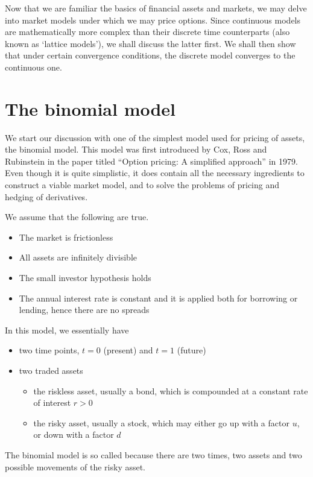 

Now that we are familiar the basics of financial assets and markets, we may delve into market models under which we may price options. Since continuous models are mathematically more complex than their discrete time counterparts (also known as `lattice models'), we shall discuss the latter first. We shall then show that under certain convergence conditions, the discrete model converges to the continuous one.



\section{The binomial model}
\label{sec:discrete-binom-model}

We start our discussion with one of the simplest model used for pricing of assets, the binomial model. This model was first introduced by Cox, Ross and Rubinstein \cite{Cox1979} in the paper titled ``Option pricing: A simplified approach'' in 1979. Even though it is quite simplistic, it does contain all the necessary ingredients to construct a viable market model, and to solve the problems of pricing and hedging of derivatives.

We assume that the following are true.
\begin{itemize}
	\item The market is frictionless
	\item All assets are infinitely divisible
	\item The small investor hypothesis holds
	\item The annual interest rate is constant and it is applied both for borrowing or lending, hence there are no spreads
\end{itemize}

In this model, we essentially have
\begin{itemize}
	\item two time points, $ t = 0 $ (present) and $ t = 1 $ (future)
	\item two traded assets
	\begin{itemize}
		\item the riskless asset, usually a bond, which is compounded at a constant rate of interest $ r > 0 $
		\item the risky asset, usually a stock, which may either go up with a factor $ u $, or down with a factor $ d $
	\end{itemize}
\end{itemize}
The binomial model is so called because there are two times, two assets and two possible movements of the risky asset.


